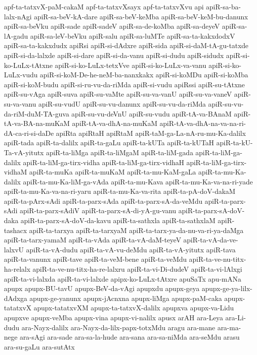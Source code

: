 {apf-ta-tatxvX-paM-cakaM
apf-ta-tatxvXsayx
apf-ta-tatxvXvu
api
apiR-sa-ba-lalx-nAgi
apiR-sa-beV-kA-dare
apiR-sa-beV-keMba
apiR-sa-beV-keM-bu-danunx
apiR-sa-beVku
apiR-sade
apiR-sadeV
apiR-sa-de-koMba
apiR-sa-deyeV
apiR-sa-lA-gadu
apiR-sa-leV-beVku
apiR-salu
apiR-sa-luMTe
apiR-sa-ta-kakxdodxV
apiR-sa-ta-kakxdudx
apiRsi
apiR-si-dAdxre
apiR-sida
apiR-si-daM-tA-gu-tatxde
apiR-si-da-lalxde
apiR-si-dare
apiR-si-da-vanu
apiR-si-dudu
apiR-sidudx
apiR-si-ko-LuLx-tAtxne
apiR-si-ko-LuLx-tetxVve
apiR-si-ko-LuLx-va-vanu
apiR-si-ko-LuLx-vudu
apiR-si-koM-De-he-neM-ba-nanxkakx
apiR-si-koMDu
apiR-si-koMba
apiR-si-koM-budu
apiR-si-ru-vu-da-riMda
apiR-si-vudu
apiRssi
apiR-su-tAtxne
apiR-su-vAga
apiR-suva
apiR-su-vaMte
apiR-su-va-vanU
apiR-su-va-vaneV
apiR-su-va-vanu
apiR-su-vudU
apiR-su-vu-danunx
apiR-su-vu-da-riMda
apiR-su-vu-da-riM-duM-TA-guva
apiR-su-vu-deVnU
apiR-su-vudu
apiR-tA-va-BAnaM
apiR-tA-va-BA-na-muKaM
apiR-tA-va-dhA-na-muKaM
apiR-tA-va-dhA-na-va-na-ri-dA-ca-ri-si-daDe
apiRta
apiRtaH
apiRtaM
apiR-taM-ga-La-nA-ru-mu-Ka-dalilx
apiR-tada
apiR-ta-dalilx
apiR-ta-gaLu
apiR-ta-kUTa
apiR-ta-kUTaH
apiR-ta-kU-Ta-vA-yitutx
apiR-ta-liMga
apiR-ta-liMgaM
apiR-ta-liM-gada
apiR-ta-liM-ga-dalilx
apiR-ta-liM-ga-tirx-vidha
apiR-ta-liM-ga-tirx-vidhaH
apiR-ta-liM-ga-tirx-vidhaM
apiR-ta-muKa
apiR-ta-muKaM
apiR-ta-mu-KaM-gaLa
apiR-ta-mu-Ka-dalilx
apiR-ta-mu-Ka-liM-ga-vAda
apiR-ta-mu-Kava
apiR-ta-mu-Ka-va-na-ri-yade
apiR-ta-mu-Ka-va-na-ri-yaru
apiR-ta-mu-Ka-va-rita
apiR-ta-pA-doV-dakaM
apiR-ta-pArx-sAdi
apiR-ta-parx-sAda
apiR-ta-parx-sA-da-veMdu
apiR-ta-parx-sAdi
apiR-ta-parx-sAdiV
apiR-ta-parx-sA-di-yA-gu-vanu
apiR-ta-parx-sA-doV-daka
apiR-ta-parx-sA-doV-da-kavu
apiR-ta-sathxla
apiR-ta-sathxlaM
apiR-tashacx
apiR-ta-tarxya
apiR-ta-tarxyaM
apiR-ta-tarx-ya-da-nu-va-ri-ya-daMga
apiR-ta-tarx-yamaM
apiR-ta-vAda
apiR-ta-vA-daM-teyeV
apiR-ta-vA-da-ve-lalxvU
apiR-ta-vA-dudu
apiR-ta-vA-vu-deMdu
apiR-ta-vA-yitutx
apiR-tava
apiR-ta-vanunx
apiR-tave
apiR-ta-veM-bene
apiR-ta-veMdu
apiR-ta-ve-nu-titx-ha-relalx
apiR-ta-ve-nu-titx-ha-re-lalxru
apiR-ta-vi-Di-dudeV
apiR-ta-vi-lAlxgi
apiR-ta-vi-lalxda
apiR-ta-vi-lalxde
apipx-ko-LuLx-tAtxre
apuSaTx
apu-mANa
apupx
apupx-BU-tavU
apupx-BeV-da-vAgi
apupxdu
apupx-geya
apupx-ge-ya-lilx-dAdxga
apupx-ge-yanunx
apupx-jAcnxna
apupx-liMga
apupx-paM-caka
apupx-tatatxvX
apupx-tatatxvXM
apupx-ta-tatxvX-dalilx
apupxva
apupx-va-Lidu
apupxve
apupx-veMba
apupx-vina
apupx-vi-nalilx
apusx
arAH
ara-Leya
ara-Li-dudu
ara-Nayx-dalilx
ara-Nayx-da-lilx-papx-totxMdu
aragu
ara-mane
ara-ma-nege
ara-sAgi
ara-sade
ara-sa-la-hude
ara-sana
ara-sa-niMda
ara-seMdu
arasu
ara-su-gaLu
ara-sutAtx
}
